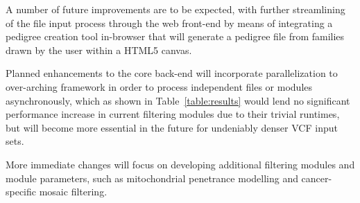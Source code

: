 A number of future improvements are to be expected, with further streamlining of the file input process through the web front-end by means of integrating a pedigree creation tool in-browser that will generate a pedigree file from families drawn by the user within a HTML5 canvas.

Planned enhancements to the core \app back-end will incorporate parallelization to over-arching framework in order to process independent files or modules asynchronously, which as shown in Table~\ref{table:results} would lend no significant performance increase in current filtering modules due to their trivial runtimes, but will become more essential in the future for undeniably denser VCF input sets.

More immediate changes will focus on developing additional filtering modules and module parameters, such as mitochondrial penetrance modelling and cancer-specific mosaic filtering.
